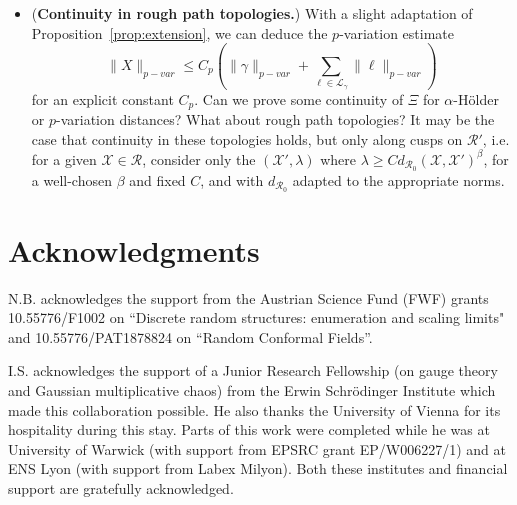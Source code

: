 \documentclass[11pt]{article}
\def\Conf{{\mathscr{R}}}
\def\Att{{\Xi}}
\begin{document}
\begin{itemize}
\item (\textbf{Continuity in rough path topologies.}) With a slight adaptation of Proposition~\ref{prop:extension}, we can deduce the $p$-variation estimate
\[\|X\|_{p-var}\leq C_p (\| \gamma\|_{p-var}+\sum_{\ell\in \mathcal{L}_\gamma} \|\ell\|_{p-var})\]
for an explicit constant $C_p$.
Can we prove some continuity of $\Att$ for  $\alpha$-H\"older or $p$-variation distances? What about rough path topologies? It may be the case that continuity in  these topologies holds, but
only along cusps on $\Conf'$, i.e. for a given $\mathcal{X}\in \Conf$,
consider only the $(\mathcal{X}',\lambda)$ where $\lambda\geq C d_{\Conf_0}(\mathcal{X}, \mathcal{X}')^\beta$, for a well-chosen $\beta$ and fixed $C$, and with $d_{\Conf_0}$ adapted to the appropriate norms.
\end{itemize}




\section*{Acknowledgments}


N.B.  acknowledges the support from the Austrian Science Fund (FWF) grants 10.55776/F1002 on ``Discrete random structures: enumeration and scaling limits" and 10.55776/PAT1878824 on ``Random Conformal Fields''. 

I.S. acknowledges the support of a Junior Research Fellowship (on gauge theory and Gaussian multiplicative chaos) from the Erwin Schrödinger Institute which made this collaboration possible. He also thanks the University of Vienna for its hospitality during this stay. Parts of this work were completed while he was at University of Warwick (with support from EPSRC grant EP/W006227/1) and at ENS Lyon (with support from Labex Milyon). Both these institutes and financial support are gratefully acknowledged.
\end{document}
